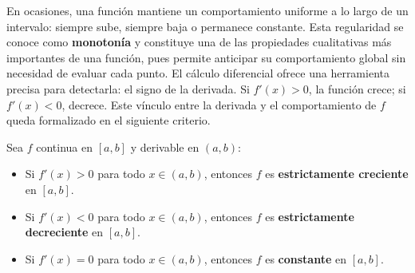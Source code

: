 En ocasiones, una función mantiene un comportamiento uniforme a lo largo
de un intervalo: siempre sube, siempre baja o permanece constante. Esta
regularidad se conoce como \textbf{monotonía} y constituye una de las
propiedades cualitativas más importantes de una función, pues permite
anticipar su comportamiento global sin necesidad de evaluar cada punto.
El cálculo diferencial ofrece una herramienta precisa para detectarla:
el signo de la derivada. Si $f'(x)>0$, la función crece; si $f'(x)<0$,
decrece. Este vínculo entre la derivada y el comportamiento de $f$ queda
formalizado en el siguiente criterio.

\begin{theorem}
Sea $f$ continua en $[a,b]$ y derivable en $(a,b)$:
\begin{itemize}
    \item Si $f'(x)>0$ para todo $x\in(a,b)$, entonces $f$ es
    \textbf{estrictamente creciente} en $[a,b]$.
    \item Si $f'(x)<0$ para todo $x\in(a,b)$, entonces $f$ es
    \textbf{estrictamente decreciente} en $[a,b]$.
    \item Si $f'(x)=0$ para todo $x\in(a,b)$, entonces $f$ es
    \textbf{constante} en $[a,b]$.
\end{itemize}
\end{theorem}

